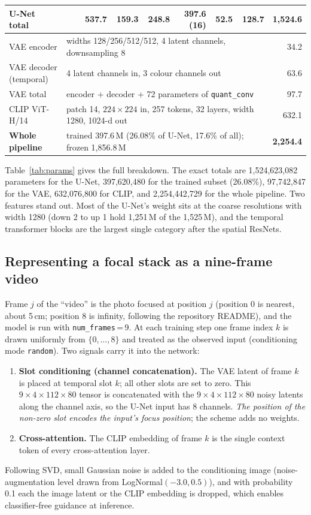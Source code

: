 \documentclass[11pt]{article}
\begin{document}
\begin{table}[tbp]
\begin{tabular}{l c r rrrrrr r}
\textbf{U-Net total} & & & 537.7 & 159.3 & 248.8 & \textbf{397.6} (16) & 52.5 & 128.7 & \textbf{1{,}524.6}\\\midrule
VAE encoder & \multicolumn{8}{l}{widths 128/256/512/512, 4 latent channels, downsampling 8} & 34.2\\
VAE decoder (temporal) & \multicolumn{8}{l}{4 latent channels in, 3 colour channels out} & 63.6\\
VAE total & \multicolumn{8}{l}{encoder + decoder + 72 parameters of \texttt{quant\_conv}} & 97.7\\
CLIP ViT-H/14 & \multicolumn{8}{l}{patch 14, $224\times224$ in, 257 tokens, 32 layers, width 1280, 1024-d out} & 632.1\\\midrule
\textbf{Whole pipeline} & \multicolumn{8}{l}{trained 397.6\,M (26.08\% of U-Net, 17.6\% of all); frozen 1{,}856.8\,M} & \textbf{2{,}254.4}\\
\bottomrule\end{tabular}
\end{table}

Table~\ref{tab:params} gives the full breakdown. The exact totals are 1{,}524{,}623{,}082 parameters for the U-Net, 397{,}620{,}480 for the trained subset (26.08\%), 97{,}742{,}847 for the VAE, 632{,}076{,}800 for CLIP, and 2{,}254{,}442{,}729 for the whole pipeline.
Two features stand out. Most of the U-Net's weight sits at the coarse resolutions with width 1280 (down 2 to up 1 hold 1{,}251\,M of the 1{,}525\,M), and the temporal transformer blocks are the largest single category after the spatial ResNets.

\subsection{Representing a focal stack as a nine-frame video}\label{sec:cond}
Frame $j$ of the ``video'' is the photo focused at position $j$ (position 0 is nearest, about 5\,cm; position 8 is infinity, following the repository README), and the model is run with \texttt{num\_frames}\,=\,9.
At each training step one frame index $k$ is drawn uniformly from $\{0,\dots,8\}$ and treated as the observed input (conditioning mode \texttt{random}). Two signals carry it into the network:
\begin{enumerate}[noitemsep]
  \item \textbf{Slot conditioning (channel concatenation).} The VAE latent of frame $k$ is placed at temporal slot $k$; all other slots are set to zero. This $9\times4\times112\times80$ tensor is concatenated with the $9\times4\times112\times80$ noisy latents along the channel axis, so the U-Net input has 8 channels. \emph{The position of the non-zero slot encodes the input's focus position}; the scheme adds no weights.
  \item \textbf{Cross-attention.} The CLIP embedding of frame $k$ is the single context token of every cross-attention layer.
\end{enumerate}
Following SVD, small Gaussian noise is added to the conditioning image (noise-augmentation level drawn from LogNormal$(-3.0,0.5)$), and with probability 0.1 each the image latent or the CLIP embedding is dropped, which enables classifier-free guidance at inference.
\end{document}
